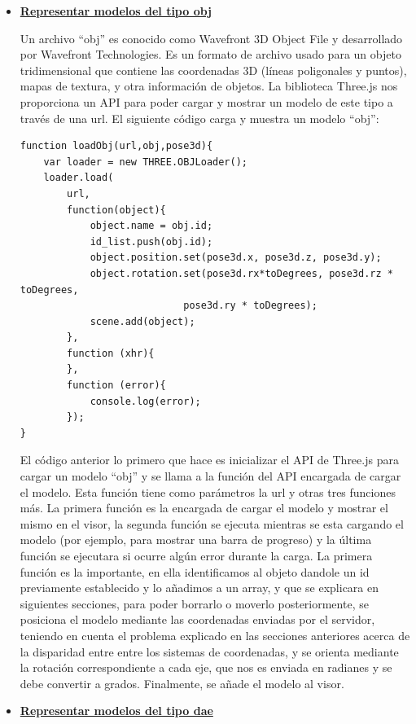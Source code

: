 \begin{itemize}
\item {\textbf{\underline{Representar modelos del tipo obj}}

Un archivo ``obj'' es conocido como Wavefront 3D Object File y desarrollado por Wavefront Technologies. Es un formato de archivo usado para un objeto tridimensional que contiene las coordenadas 3D (líneas poligonales y puntos), mapas de textura, y otra información de objetos. La biblioteca Three.js nos proporciona un API para poder cargar y mostrar un modelo de este tipo a través de una url. El siguiente código carga y muestra un modelo ``obj'':

\begin{lstlisting}[frame=single]
function loadObj(url,obj,pose3d){
	var loader = new THREE.OBJLoader();
	loader.load(
		url,
		function(object){
			object.name = obj.id;
			id_list.push(obj.id);
			object.position.set(pose3d.x, pose3d.z, pose3d.y);
			object.rotation.set(pose3d.rx*toDegrees, pose3d.rz * toDegrees, 
							pose3d.ry * toDegrees);
			scene.add(object);
		},
		function (xhr){
		},
		function (error){
			console.log(error);
		});
}
\end{lstlisting}

El código anterior lo primero que hace es inicializar el API de Three.js para cargar un modelo ``obj'' y se llama a la función del API encargada de cargar el modelo. Esta función tiene como parámetros la url y otras tres funciones más. La primera función es la encargada de cargar el modelo y mostrar el mismo en el visor, la segunda función se ejecuta mientras se esta cargando el modelo (por ejemplo, para mostrar una barra de progreso) y la última función se ejecutara si ocurre algún error durante la carga. La primera función es la importante, en ella identificamos al objeto dandole un id previamente establecido y lo añadimos a un array, y que se explicara en siguientes secciones, para poder borrarlo o moverlo posteriormente, se posiciona el modelo mediante las coordenadas enviadas por el servidor, teniendo en cuenta el problema explicado en las secciones anteriores acerca de la disparidad entre entre los sistemas de coordenadas, y se orienta mediante la rotación correspondiente a cada eje, que nos es enviada en radianes y se debe convertir a grados.
Finalmente, se añade el modelo al visor.}

\item{\textbf{\underline{Representar modelos del tipo dae}}

}
\end{itemize}
